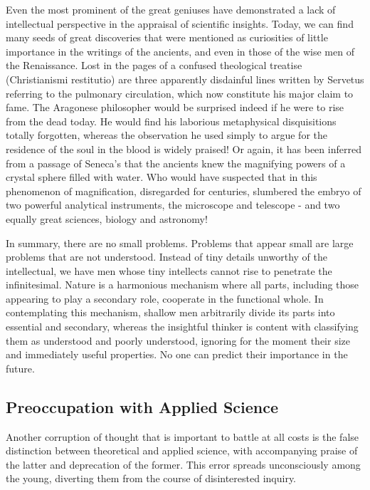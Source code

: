 \documentclass{article}
\begin{document}
Even the most prominent of the great geniuses have demonstrated a lack of intellectual perspective in the appraisal of scientific insights. Today, we can find many seeds of great discoveries that were mentioned as curiosities of little importance in the writings of the ancients, and even in those of the wise men of the Renaissance. Lost in the pages of a confused theological treatise (Christianismi restitutio) are three apparently disdainful lines written by Servetus referring to the pulmonary circulation, which now constitute his major claim to fame. The Aragonese philosopher would be surprised indeed if he were to rise from the dead today. He would find his laborious metaphysical disquisitions totally forgotten, whereas the observation he used simply to argue for the residence of the soul in the blood is widely praised! Or again, it has been inferred from a passage of Seneca’s that the ancients knew the magnifying powers of a crystal sphere filled with water. Who would have suspected that in this phenomenon of magnification, disregarded for centuries, slumbered the embryo of two powerful analytical instruments, the microscope and telescope - and two equally great sciences, biology and astronomy!

In summary, there are no small problems. Problems that appear small are large problems that are not understood. Instead of tiny details unworthy of the intellectual, we have men whose tiny intellects cannot rise to penetrate the infinitesimal. Nature is a harmonious mechanism where all parts, including those appearing to play a secondary role, cooperate in the functional whole. In contemplating this mechanism, shallow men arbitrarily divide its parts into essential and secondary, whereas the insightful thinker is content with classifying them as understood and poorly understood, ignoring for the moment their size and immediately useful properties. No one can predict their importance in the future.

\subsection*{Preoccupation with Applied Science}

Another corruption of thought that is important to battle at all costs is the false distinction between theoretical and applied science, with accompanying praise of the latter and deprecation of the former. This error spreads unconsciously among the young, diverting them from the course of disinterested inquiry.
\end{document}
